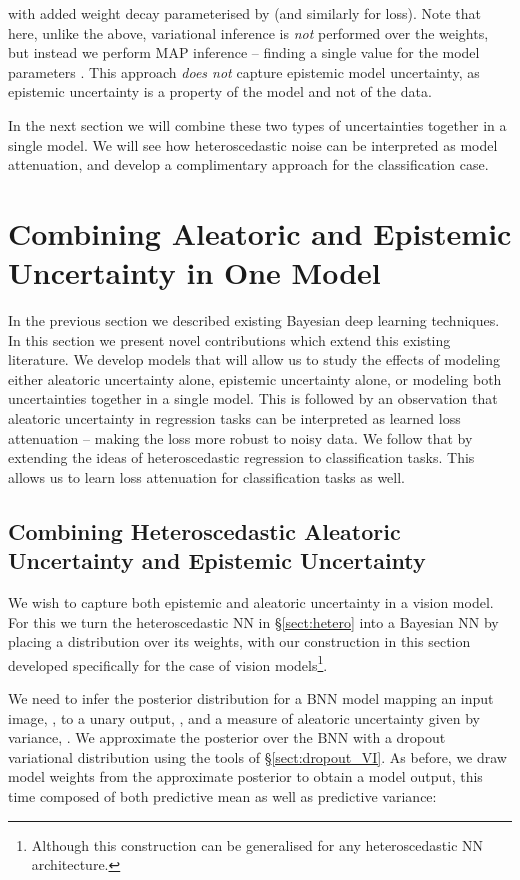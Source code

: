 \documentclass{article}
\begin{document}
with added weight decay parameterised by  (and similarly for  loss).
Note that here, unlike the above, variational inference is \textit{not} performed over the weights, but instead we perform MAP inference -- finding a single value for the model parameters . This approach \textit{does not} capture epistemic model uncertainty, as epistemic uncertainty is a property of the model and not of the data.

In the next section we will combine these two types of uncertainties together in a single model. We will see how heteroscedastic noise can be interpreted as model attenuation, and develop a complimentary approach for the classification case. 


\section{Combining Aleatoric and Epistemic Uncertainty in One Model}
\label{sec:method}

In the previous section we described existing Bayesian deep learning techniques. In this section we present novel contributions which extend this existing literature. We develop models that will allow us to study the effects of modeling either aleatoric uncertainty alone, epistemic uncertainty alone, or modeling both uncertainties together in a single model. This is followed by an observation that aleatoric uncertainty in regression tasks can be interpreted as learned loss attenuation -- making the loss more robust to noisy data. We follow that by extending the ideas of heteroscedastic regression to classification tasks. This allows us to learn loss attenuation for classification tasks as well. 

\subsection{Combining Heteroscedastic Aleatoric Uncertainty and Epistemic Uncertainty}

We wish to capture both epistemic and aleatoric uncertainty in a vision model.
For this we turn the heteroscedastic NN in \S\ref{sect:hetero} into a Bayesian NN by placing a distribution over its weights, with our construction in this section developed specifically for the case of vision models\footnote{Although this construction can be generalised for any heteroscedastic NN architecture.}.

We need to infer the posterior distribution for a BNN model  mapping an input image, , to a unary output, , and a measure of aleatoric uncertainty given by variance, . We approximate the posterior over the BNN with a dropout variational distribution using the tools of \S\ref{sect:dropout_VI}. 
As before, we draw model weights from the approximate posterior  to obtain a model output, this time composed of both predictive mean as well as predictive variance:
\end{document}
